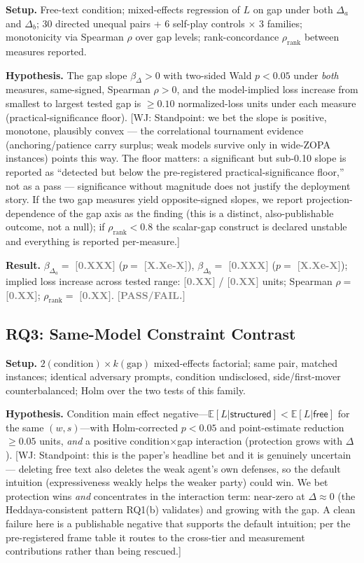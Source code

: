 \documentclass[conference]{IEEEtran}
\newcommand{\ph}[1]{\textcolor{Gray}{\textbf{[#1]}}}
\newcommand{\wj}[1]{\textcolor{RedOrange}{\footnotesize\textsf{[WJ: #1]}}}
\begin{document}
\textbf{Setup.} Free-text condition; mixed-effects regression of $L$ on gap under both $\Delta_a$ and $\Delta_b$; 30 directed unequal pairs + 6 self-play controls $\times$ 3 families; monotonicity via Spearman $\rho$ over gap levels; rank-concordance $\rho_{\mathrm{rank}}$ between measures reported.

\textbf{Hypothesis.} The gap slope $\beta_\Delta > 0$ with two-sided Wald $p < 0.05$ under \emph{both} measures, same-signed, Spearman $\rho > 0$, and the model-implied loss increase from smallest to largest tested gap is $\geq 0.10$ normalized-loss units under each measure (practical-significance floor). \wj{Standpoint: we bet the slope is positive, monotone, plausibly convex --- the correlational tournament evidence (anchoring/patience carry surplus; weak models survive only in wide-ZOPA instances) points this way. The floor matters: a significant but sub-0.10 slope is reported as ``detected but below the pre-registered practical-significance floor,'' not as a pass --- significance without magnitude does not justify the deployment story. If the two gap measures yield opposite-signed slopes, we report projection-dependence of the gap axis as the finding (this is a distinct, also-publishable outcome, not a null); if $\rho_{\mathrm{rank}} < 0.8$ the scalar-gap construct is declared unstable and everything is reported per-measure.}

\textbf{Result.} $\beta_{\Delta_a} = $ \ph{0.XXX} ($p = $ \ph{X.Xe-X}), $\beta_{\Delta_b} = $ \ph{0.XXX} ($p = $ \ph{X.Xe-X}); implied loss increase across tested range: \ph{0.XX} / \ph{0.XX} units; Spearman $\rho = $ \ph{0.XX}; $\rho_{\mathrm{rank}} = $ \ph{0.XX}. \ph{PASS/FAIL.}

\subsection{RQ3: Same-Model Constraint Contrast}
\label{sec:rq3}

\textbf{Setup.} $2(\text{condition}) \times k(\text{gap})$ mixed-effects factorial; same pair, matched instances; identical adversary prompts, condition undisclosed, side/first-mover counterbalanced; Holm over the two tests of this family.

\textbf{Hypothesis.} Condition main effect negative---$\mathbb{E}[L|\textsf{structured}] < \mathbb{E}[L|\textsf{free}]$ for the same $(w,s)$---with Holm-corrected $p < 0.05$ and point-estimate reduction $\geq 0.05$ units, \emph{and} a positive condition$\times$gap interaction (protection grows with $\Delta$). \wj{Standpoint: this is the paper's headline bet and it is genuinely uncertain --- deleting free text also deletes the weak agent's own defenses, so the default intuition (expressiveness weakly helps the weaker party) could win. We bet protection wins \emph{and} concentrates in the interaction term: near-zero at $\Delta{\approx}0$ (the Heddaya-consistent pattern RQ1(b) validates) and growing with the gap. A clean failure here is a publishable negative that supports the default intuition; per the pre-registered frame table it routes to the cross-tier and measurement contributions rather than being rescued.}
\end{document}
